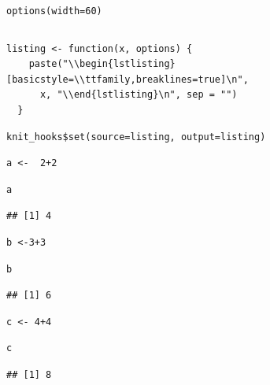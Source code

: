 \documentclass[a4paper, french, 11 pt]{article}\usepackage[]{graphicx}\usepackage[]{xcolor}
\makeatletter
\newenvironment{kframe}{%
 \def\at@end@of@kframe{}%
 \ifinner\ifhmode%
  \def\at@end@of@kframe{\end{minipage}}%
  \begin{minipage}{\columnwidth}%
 \fi\fi%
 \def\FrameCommand##1{\hskip\@totalleftmargin \hskip-\fboxsep
 \colorbox{shadecolor}{##1}\hskip-\fboxsep
     \hskip-\linewidth \hskip-\@totalleftmargin \hskip\columnwidth}%
 \MakeFramed {\advance\hsize-\width
   \@totalleftmargin\z@ \linewidth\hsize
   \@setminipage}}%
 {\par\unskip\endMakeFramed%
 \at@end@of@kframe}
\newenvironment{knitrout}{}{} %
\makeatother
\begin{document}
\begin{knitrout}
\color{fgcolor}\begin{kframe}
\begin{lstlisting}[basicstyle=\ttfamily,breaklines=true]
  options(width=60)\end{lstlisting}
\begin{lstlisting}[basicstyle=\ttfamily,breaklines=true]
\end{lstlisting}
\begin{lstlisting}[basicstyle=\ttfamily,breaklines=true]
  listing <- function(x, options) {
    paste("\\begin{lstlisting}[basicstyle=\\ttfamily,breaklines=true]\n",
      x, "\\end{lstlisting}\n", sep = "")
  }\end{lstlisting}
\begin{lstlisting}[basicstyle=\ttfamily,breaklines=true]
  knit_hooks$set(source=listing, output=listing)\end{lstlisting}
\begin{lstlisting}[basicstyle=\ttfamily,breaklines=true]
a <-  2+2\end{lstlisting}
\begin{lstlisting}[basicstyle=\ttfamily,breaklines=true]
a\end{lstlisting}
\begin{lstlisting}[basicstyle=\ttfamily,breaklines=true]
## [1] 4
\end{lstlisting}
\begin{lstlisting}[basicstyle=\ttfamily,breaklines=true]
b <-3+3\end{lstlisting}
\begin{lstlisting}[basicstyle=\ttfamily,breaklines=true]
b\end{lstlisting}
\begin{lstlisting}[basicstyle=\ttfamily,breaklines=true]
## [1] 6
\end{lstlisting}
\begin{lstlisting}[basicstyle=\ttfamily,breaklines=true]
c <- 4+4\end{lstlisting}
\begin{lstlisting}[basicstyle=\ttfamily,breaklines=true]
c\end{lstlisting}
\begin{lstlisting}[basicstyle=\ttfamily,breaklines=true]
## [1] 8
\end{lstlisting}
\begin{lstlisting}[basicstyle=\ttfamily,breaklines=true]

\end{lstlisting}
\end{kframe}
\end{knitrout}
\end{document}
